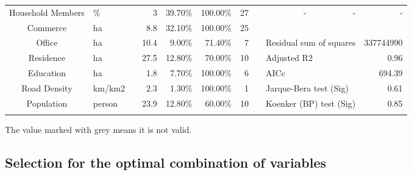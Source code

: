 \documentclass[utf8]{article}
\begin{document}
\begin{table}
\begin{tabular}{clrrrrrcrrr}
		Household Members & \% & & 3 & 39.70\% & 100.00\% & 27 & & - & - & - \\
		
		\cmidrule{1-2}\cmidrule{4-7}\cmidrule{9-11}
		
		Commerce & ha & & \cellcolor[rgb]{ .8,  .8,  .8}8.8 & 32.10\% & 100.00\% & 25 & & &  \\
		
		Office & ha & & \cellcolor[rgb]{ .8,  .8,  .8}10.4 & \cellcolor[rgb]{ .8,  .8,  .8}9.00\% & \cellcolor[rgb]{ .8,  .8,  .8}71.40\% & 7 & & \multicolumn{2}{l}{Residual sum of squares} & 337744990 \\
		
		Residence & ha & & \cellcolor[rgb]{ .8,  .8,  .8}27.5 & 12.80\% & \cellcolor[rgb]{ .8,  .8,  .8}70.00\% & 10 & & \multicolumn{2}{l}{Adjusted R2} & 0.96 \\
		
		Education & ha & & 1.8 & \cellcolor[rgb]{ .8,  .8,  .8}7.70\% & 100.00\% & 6 & & \multicolumn{2}{l}{AICc} & 694.39 \\
		
		Road Density & km/km2 & & 2.3 & \cellcolor[rgb]{ .8,  .8,  .8}1.30\% & 100.00\% & 1 & & \multicolumn{2}{l}{Jarque-Bera test (Sig)} & 0.61 \\
		
		Population & person & & \cellcolor[rgb]{ .8,  .8,  .8}23.9 & 12.80\% & \cellcolor[rgb]{ .8,  .8,  .8}60.00\% & 10 & & \multicolumn{2}{l}{Koenker (BP) test (Sig)} & 0.85 \\
		
		\Xhline{1.5pt}
	\end{tabular}%
	\normalsize
	\begin{description}
		\label{note:ExploratoryRegression}
		\item[*Note:]
		The value marked with grey means it is not valid.
	\end{description}
\end{table}%

\subsection{Selection for the optimal combination of variables}
\indent
\end{document}
